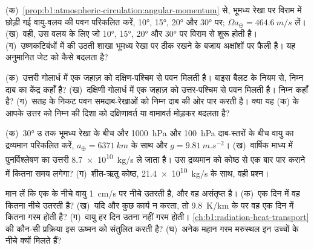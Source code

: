 \begin{exercise}[$\star\star$]\label{exo:b1:atmospheric-circulation:6}
(क)~\cref{prop:b1:atmospheric-circulation:angular-momentum} से, भूमध्य रेखा पर विराम में छोड़ी गई वायु-वलय की पवन परिकलित करें, \ang{10}, \ang{15}, \ang{20} और \ang{30} पर; $\Omega a_\oplus = \qty{464.6}{m/s}$ लें। (ख)~वही, उस वलय के लिए जो \ang{10}, \ang{15}, \ang{20} और \ang{30} पर विराम से शुरू होती है। (ग)~उष्णकटिबंधों में  की उठती शाखा भूमध्य रेखा पर ठीक रखने के बजाय अक्षांशों पर फैली है। यह अनुमानित जेट को कैसे बदलता है?
\end{exercise}

\begin{exercise}[$\star\star$]\label{exo:b1:atmospheric-circulation:7}
(क)~उत्तरी गोलार्ध में एक जहाज़ को दक्षिण-पश्चिम से पवन मिलती है। बाइस बैलट के नियम से, निम्न दाब का केंद्र कहाँ है? (ख)~दक्षिणी गोलार्ध में एक जहाज़ को उत्तर-पश्चिम से पवन मिलती है। निम्न कहाँ है? (ग)~सतह के निकट पवन समदाब-रेखाओं को निम्न दाब की ओर पार करती है। क्या यह (क) के आपके उत्तर को निम्न की दिशा को दक्षिणावर्त या वामावर्त मोड़कर बदलता है?
\end{exercise}

\begin{exercise}[$\star\star$]\label{exo:b1:atmospheric-circulation:8}
(क)~\ang{30} उ तक भूमध्य रेखा के बीच और \qty{1000}{hPa} और \qty{100}{hPa} दाब-स्तरों के बीच वायु का द्रव्यमान परिकलित करें, $a_\oplus = \qty{6371}{km}$ के साथ
और $g = \qty{9.81}{m.s^{-2}}$। (ख)~वार्षिक माध्य में पुनर्विश्लेषण का उत्तरी  \qty{8.7e10}{kg/s} ले जाता है। उस द्रव्यमान को कोष्ठ से एक बार पार कराने में कितना समय लगेगा? (ग)~शीत-ऋतु कोष्ठ, \qty{21.4e10}{kg/s} के साथ, वही प्रश्न।
\end{exercise}

\begin{exercise}[$\star\star$]\label{exo:b1:atmospheric-circulation:9}
मान लें कि एक  के नीचे वायु \qty{1}{cm/s} पर नीचे उतरती है, और वह असंतृप्त है। (क)~एक दिन में वह कितना नीचे उतरती है? (ख)~यदि और कुछ कार्य न करता, तो \qty{9.8}{K/km} के  पर वह एक दिन में कितना गरम होती है? (ग)~वायु हर दिन उतना नहीं गरम होती। \cref{ch:b1:radiation-heat-transport} की कौन-सी प्रक्रिया इस ऊष्मन को संतुलित करती है? (घ)~अनेक महान गरम मरुस्थल इन उच्चों के नीचे क्यों मिलते हैं?
\end{exercise}

